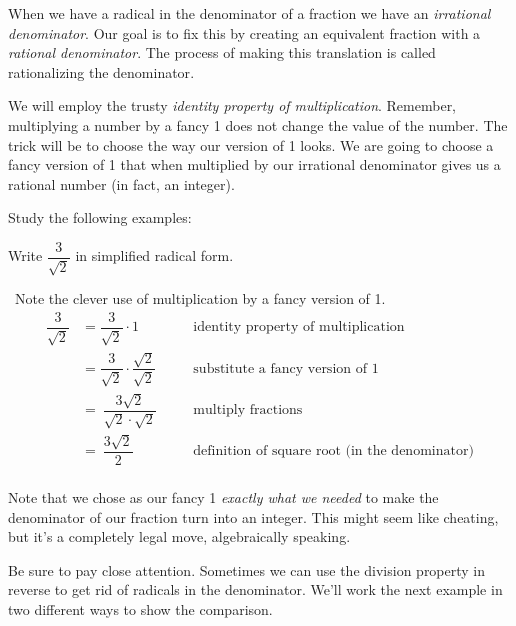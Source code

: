 When we have a radical in the denominator of a fraction we have an \textit{irrational denominator}. Our goal is to fix this by creating an equivalent fraction with a \textit{rational denominator}. The process of making this translation is called \gls{rationalizing the denominator}.

We will employ the trusty \textit{identity property of multiplication}. Remember, multiplying a number by a fancy 1 does not change the value of the number. The trick will be to choose the way our version of 1 looks. We are going to choose a fancy version of 1 that when multiplied by our irrational denominator gives us a rational number (in fact, an integer).

Study the following examples:

\begin{boxex}
Write $\dfrac{3}{\sqrt{2}}$ in simplified radical form.

\exsoln\ Note the clever use of multiplication by a fancy version of 1.
\[\begin{aligned}
\dfrac{3}{\sqrt{2}} &= \dfrac{3}{\sqrt{2}} \cdot 1
&&\quad\text{identity property of multiplication}\\
&= \dfrac{3}{\sqrt{2}} \cdot \dfrac{\sqrt{2}}{\sqrt{2}}
&&\quad\text{substitute a fancy version of 1}\\
&=~ \dfrac{3 \sqrt{2}}{\sqrt{2} \cdot \sqrt{2}}
&&\quad\text{multiply fractions}\\
&=~ \dfrac{3 \sqrt{2}}{2}
&&\quad\text{definition of square root (in the denominator)}\\
\end{aligned}
\]
\end{boxex}

Note that we chose as our fancy 1 \textit{exactly what we needed} to make the denominator of our fraction turn into an integer. This might seem like cheating, but it's a completely legal move, algebraically speaking.

Be sure to pay close attention. Sometimes we can use the division property in reverse to get rid of radicals in the denominator. We'll work the next example in two different ways to show the comparison.

